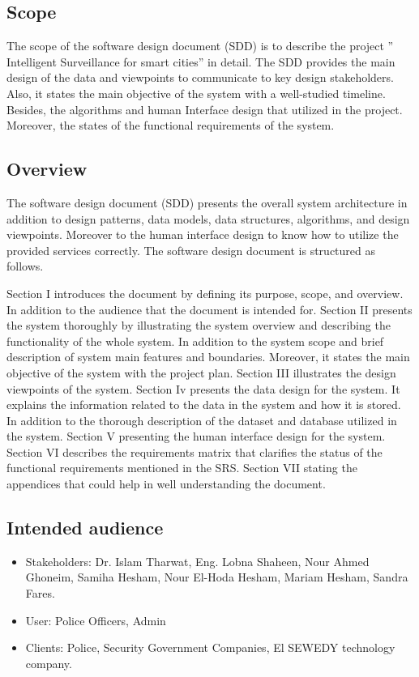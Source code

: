 \documentclass[12pt]{article}
\begin{document}
\subsection{Scope}

The scope of the software design document (SDD) is to describe the project ” Intelligent Surveillance for smart cities” in detail. The SDD provides the main design of the data and viewpoints to communicate to key design stakeholders. Also, it states the main objective of the system with a well-studied timeline. Besides, the algorithms and human Interface design that utilized in the project. Moreover, the states of the functional requirements of the system.

\subsection{Overview}
The software design document (SDD) presents the overall system architecture in addition to design patterns, data models, data structures, algorithms, and design viewpoints. Moreover to the human interface design to know how to utilize the provided services correctly. The software design document is structured as follows.

 Section I introduces the document by defining its purpose, scope, and overview. In addition to the audience that the document is intended for. Section II presents the system thoroughly by illustrating the system overview and describing the functionality of the whole system. In addition to the system scope and brief description of system main features and boundaries. Moreover, it states the main objective of the system with the project plan. Section III illustrates the design viewpoints of the system. Section Iv presents the data design for the system. It explains the information related to the data in the system and how it is stored. In addition to the thorough description of the dataset and database utilized in the system. Section V presenting the human interface design for the system. Section VI describes the requirements matrix that clarifies the status of the functional requirements mentioned in the SRS. Section VII stating the appendices that could help in well understanding the document.

\subsection{Intended audience}

\begin{itemize}
    \item Stakeholders: 
    Dr. Islam Tharwat,  
    Eng. Lobna Shaheen,   
    Nour Ahmed Ghoneim,  
    Samiha Hesham,
    Nour El-Hoda Hesham,  
    Mariam Hesham, 
    Sandra Fares.
    
\item User: 
    Police Officers,  
    Admin  
    
\item Clients:  
    Police,
    Security Government Companies, 
    El SEWEDY technology company.  

\end{itemize}
\end{document}

